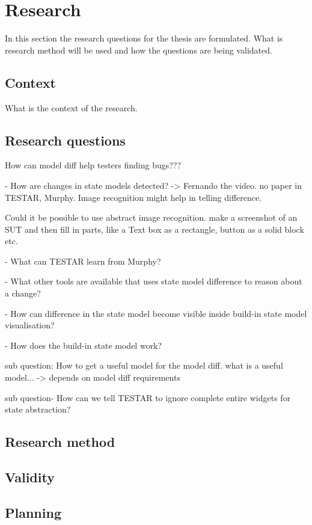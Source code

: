 \section{Research} \label{questions}
In this section the research questions for the thesis are formulated. What is research method will be used and how the questions are being validated.

\subsection{Context}
What is the context of the research. 

\subsection{Research questions}

How can model diff help testers finding bugs???

- How are changes in state models detected? -> Fernando the video. no paper in TESTAR, Murphy. Image recognition might help in telling difference. 

Could it be possible to use abstract image recognition. make a screenshot of an SUT and then fill in parts, like a Text box as a rectangle, button as a solid block etc. 


- What can TESTAR learn from Murphy?

- What other tools are available that uses state model difference to reason about a change? 

- How can difference in the state model become visible inside build-in state model visualisation?

- How does the build-in state model work?

sub question: How to get a useful model for the model diff.
what is a useful model... -> depends on model diff requirements

sub question- How can we tell TESTAR to ignore complete entire widgets for state abstraction?


\subsection{Research method}

\subsection{Validity}

\subsection{Planning}